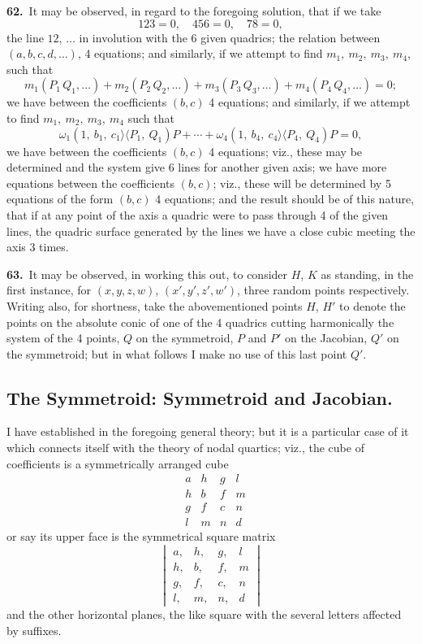 \documentclass[11pt,a4paper]{article}
\newcommand{\bw}{\mathrel{\rangle\!\langle}}
\begin{document}
\textbf{62.}\ It may be observed, in regard to the foregoing solution, that if we take
\[
123 = 0,\quad 456 = 0,\quad 78 = 0,
\]
the line $12$, $\ldots$ in involution with the 6 given quadrics; the relation between $(a, b, c, d, \ldots)$, 4 equations; and similarly, if we attempt to find $m_1,\ m_2,\ m_3,\ m_4$, such that
\[
m_1(P_1\,Q_1,\ldots) + m_2(P_2\,Q_2,\ldots) + m_3(P_3\,Q_3,\ldots) + m_4(P_4\,Q_4,\ldots) = 0;
\]
we have between the coefficients $(b, c)$ 4 equations; and similarly, if we attempt to find $m_1,\ m_2,\ m_3,\ m_4$ such that
\[
\omega_1(1,\ b_1,\ c_1\bw P_1,\ Q_1)P + \cdots + \omega_4(1,\ b_4,\ c_4\bw P_4,\ Q_4)P = 0,
\]
we have between the coefficients $(b, c)$ 4 equations; viz., these may be determined and the system give 6 lines for another given axis;
we have more equations between the coefficients $(b, c)$; viz., these will be determined by 5 equations of the form $(b, c)$ 4 equations; and the result should be of this nature, that if at any point of the axis a quadric were to pass through 4 of the given lines, the quadric surface generated by the lines we have a close cubic meeting the axis 3 times.

\medskip

\textbf{63.}\ It may be observed, in working this out, to consider $H$, $K$ as standing, in the first instance, for $(x, y, z, w)$, $(x', y', z', w')$, three random points respectively. Writing also, for shortness, take the abovementioned points $H$, $H'$ to denote the points on the absolute conic of one of the 4 quadrics cutting harmonically the system of the 4 points, $Q$ on the symmetroid, $P$ and $P'$ on the Jacobian, $Q'$ on the symmetroid; but in what follows I make no use of this last point $Q'$.

\newpage
\setcounter{page}{156}

\subsection*{The Symmetroid: Symmetroid and Jacobian.}

\noindent I have established in the foregoing general theory; but it is a particular case of it which connects itself with the theory of nodal quartics; viz., the cube of coefficients is a symmetrically arranged cube
\[
\begin{matrix}
 & a & h & g & l\\
 & h & b & f & m\\
 & g & f & c & n\\
 & l & m & n & d
\end{matrix}
\]
or say its upper face is the symmetrical square matrix
\[
\begin{vmatrix}
a, & h, & g, & l\\
h, & b, & f, & m\\
g, & f, & c, & n\\
l, & m, & n, & d
\end{vmatrix}
\]
and the other horizontal planes, the like square with the several letters affected by suffixes.
\end{document}
